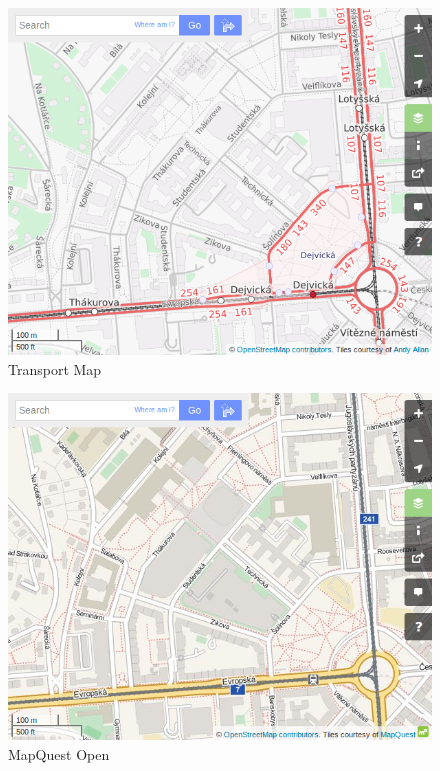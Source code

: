 
\begin{figure}[H]
    \centering
    \includegraphics[width=11.5cm]{pictures/osm_transport.png} 
    \caption{Transport Map}
    \label{fig:transport}
\end{figure}

\begin{figure}[H]
    \centering
    \includegraphics[width=11.5cm]{pictures/osm_mapquest.png} 
    \caption{MapQuest Open}
    \label{fig:mapquest}
\end{figure}


